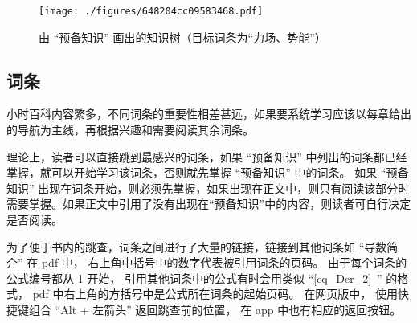 \begin{figure}[ht]
\centering
\texttt{[image: ./figures/648204cc09583468.pdf]}
\caption{由 “预备知识” 画出的知识树（目标词条为“力场、势能”）}\label{fig_about_1}
\end{figure}

\subsection{词条}
小时百科内容繁多，不同词条的重要性相差甚远，如果要系统学习应该以每章给出的导航为主线，再根据兴趣和需要阅读其余词条。

理论上，读者可以直接跳到最感兴的词条，如果 “预备知识” 中列出的词条都已经掌握，就可以开始学习该词条，否则就先掌握 “预备知识” 中的词条。 如果 “预备知识” 出现在词条开始，则必须先掌握，如果出现在正文中，则只有阅读该部分时需要掌握。如果正文中引用了没有出现在“预备知识”中的内容，则读者可自行决定是否阅读。

为了便于书内的跳查，词条之间进行了大量的链接，链接到其他词条如 “导数简介” 在 pdf 中， 右上角中括号中的数字代表被引用词条的页码。 由于每个词条的公式编号都从 1 开始， 引用其他词条中的公式有时会用类似 “\autoref{eq_Der_2}~” 的格式， pdf 中右上角的方括号中是公式所在词条的起始页码。 在网页版中， 使用快捷键组合 “Alt + 左箭头” 返回跳查前的位置， 在 app 中也有相应的返回按钮。
